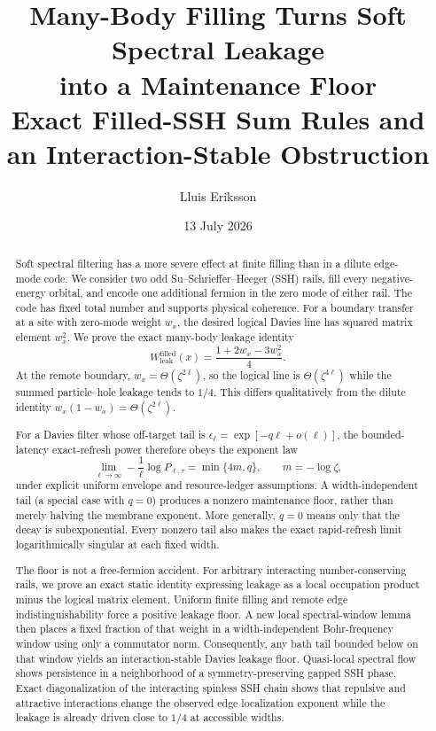\documentclass[11pt,a4paper]{article}
\title{\textcolor{ink}{\bfseries Many-Body Filling Turns Soft Spectral Leakage\\into a Maintenance Floor}\\[0.5em]
\large Exact Filled-SSH Sum Rules and an Interaction-Stable Obstruction}
\author{Lluis Eriksson}
\affil{Independent Researcher}
\date{13 July 2026}
\theoremstyle{remark}
\begin{document}
\maketitle

\begin{abstract}
Soft spectral filtering has a more severe effect at finite filling than in a dilute edge-mode code.  We consider two odd Su--Schrieffer--Heeger (SSH) rails, fill every negative-energy orbital, and encode one additional fermion in the zero mode of either rail.  The code has fixed total number and supports physical coherence.  For a boundary transfer at a site with zero-mode weight $w_x$, the desired logical Davies line has squared matrix element $w_x^2$.  We prove the exact many-body leakage identity
\[
 W_{\mathrm{leak}}^{\mathrm{filled}}(x)
 =\frac{1+2w_x-3w_x^2}{4}.
\]
At the remote boundary, $w_x=\Theta(\zeta^{2\ell})$, so the logical line is $\Theta(\zeta^{4\ell})$ while the summed particle--hole leakage tends to $1/4$.  This differs qualitatively from the dilute identity $w_x(1-w_x)=\Theta(\zeta^{2\ell})$.

For a Davies filter whose off-target tail is $\epsilon_\ell=\exp[-q\ell+o(\ell)]$, the bounded-latency exact-refresh power therefore obeys the exponent law
\[
 \lim_{\ell\to\infty}-\frac1\ell\log P_{\ell,\tau}
 =\min\{4m,q\},\qquad m=-\log\zeta,
\]
under explicit uniform envelope and resource-ledger assumptions.  A width-independent tail (a special case with $q=0$) produces a nonzero maintenance floor, rather than merely halving the membrane exponent.  More generally, $q=0$ means only that the decay is subexponential.  Every nonzero tail also makes the exact rapid-refresh limit logarithmically singular at each fixed width.

The floor is not a free-fermion accident.  For arbitrary interacting number-conserving rails, we prove an exact static identity expressing leakage as a local occupation product minus the logical matrix element.  Uniform finite filling and remote edge indistinguishability force a positive leakage floor.  A new local spectral-window lemma then places a fixed fraction of that weight in a width-independent Bohr-frequency window using only a commutator norm.  Consequently, any bath tail bounded below on that window yields an interaction-stable Davies leakage floor.  Quasi-local spectral flow shows persistence in a neighborhood of a symmetry-preserving gapped SSH phase.  Exact diagonalization of the interacting spinless SSH chain shows that repulsive and attractive interactions change the observed edge localization exponent while the leakage is already driven close to $1/4$ at accessible widths.
\end{abstract}
\end{document}
